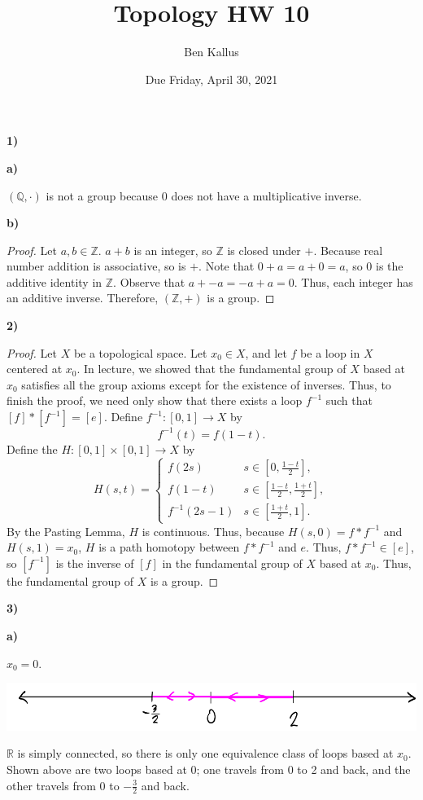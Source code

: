 \documentclass[12pt]{report}
\title{Topology HW 10}
\author{Ben Kallus}
\date{Due Friday, April 30, 2021}
\begin{document}
\maketitle

\medskip\noindent\textbf{1)}

\medskip\noindent\textbf{a)}

    $(\mathbb Q, \cdot)$ is not a group because 0 does not have a multiplicative inverse.

\medskip\noindent\textbf{b)}
\begin{proof}
    Let $a, b \in \mathbb Z$.
    $a+b$ is an integer, so $\mathbb Z$ is closed under $+$.
    Because real number addition is associative, so is $+$.
    Note that $0 + a = a + 0 = a$, so $0$ is the additive identity in $\mathbb Z$.
    Observe that $a + -a = -a + a = 0$.
    Thus, each integer has an additive inverse.
    Therefore, $(\mathbb Z, +)$ is a group.
\end{proof}

\medskip\noindent\textbf{2)}
\begin{proof}
    Let $X$ be a topological space.
    Let $x_0 \in X$, and let $f$ be a loop in $X$ centered at $x_0$.
    In lecture, we showed that the fundamental group of $X$ based at $x_0$ satisfies all the group axioms except for the existence of inverses.
    Thus, to finish the proof, we need only show that there exists a loop $f^{-1}$ such that $[f] * [f^{-1}] = [e]$.
    Define $f^{-1}: [0,1] \to X$ by $$f^{-1}(t) = f(1-t).$$
    Define the $H: [0,1] \times[0,1] \to X$ by $$H(s, t) = \begin{cases} f(2s) & s \in \left[0,\frac{1-t}2\right], \\ f(1-t) & s \in \left[\frac{1-t}2, \frac{1+t}2\right], \\ f^{-1}(2s-1) & s \in \left[\frac{1+t}2,1\right]. \end{cases}$$
    By the Pasting Lemma, $H$ is continuous.
    Thus, because $H(s,0) = f * f^{-1}$ and $H(s,1) = x_0$, $H$ is a path homotopy between $f * f^{-1}$ and $e$.
    Thus, $f * f^{-1} \in [e]$, so $[f^{-1}]$ is the inverse of $[f]$ in the fundamental group of $X$ based at $x_0$.
    Thus, the fundamental group of $X$ is a group.
\end{proof}

\newpage\noindent\textbf{3)}

\medskip\noindent\textbf{a)}

    $x_0 = 0$.
    \begin{center}\includegraphics[scale=.6]{1.png}\end{center}
    $\mathbb R$ is simply connected, so there is only one equivalence class of loops based at $x_0$.
    Shown above are two loops based at 0; one travels from 0 to 2 and back, and the other travels from 0 to $-\frac32$ and back.
\end{document}

